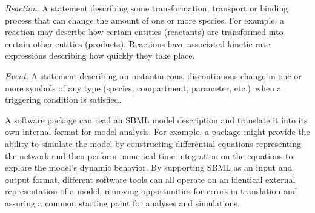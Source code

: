 \begin{description}
\item \emph{Reaction}: A statement describing some transformation,
  transport or binding process that can change the amount of one
  or more species.  For example, a reaction may describe how
  certain entities (reactants) are transformed into certain other
  entities (products).  Reactions have associated kinetic rate
  expressions describing how quickly they take place.
  
\item \emph{Event}: A statement describing an instantaneous,
  discontinuous change in one or more symbols of any type
  (species, compartment, parameter, etc.)\ when a triggering
  condition is satisfied.

\end{description}

A software package can read an SBML model description and
translate it into its own internal format for model analysis.  For
example, a package might provide the ability to simulate the model
by constructing differential equations representing the network
and then perform numerical time integration on the equations to
explore the model's dynamic behavior.  By supporting SBML as an
input and output format, different software tools can all operate
on an identical external representation of a model, removing
opportunities for errors in translation and assuring a common
starting point for analyses and simulations.

